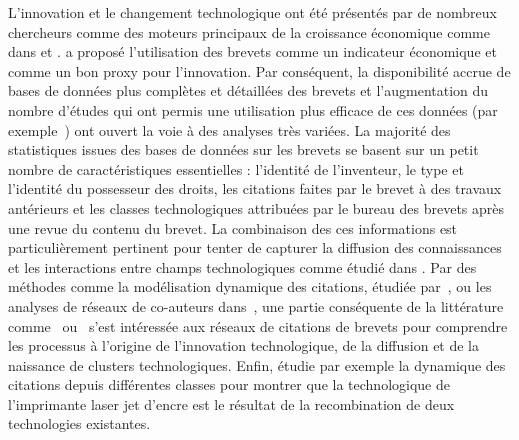 {L'innovation et le changement technologique ont été présentés par de nombreux chercheurs comme des moteurs principaux de la croissance économique comme dans \cite{aghionhowitt1992} et \cite{romer1990}. \cite{RePEc:nbr:nberwo:3301} a proposé l'utilisation des brevets comme un indicateur économique et comme un bon proxy pour l'innovation. Par conséquent, la disponibilité accrue de bases de données plus complètes et détaillées des brevets et l'augmentation du nombre d'études qui ont permis une utilisation plus efficace de ces données (par exemple~\cite{Hall2001}) ont ouvert la voie à des analyses très variées. La majorité des statistiques issues des bases de données sur les brevets se basent sur un petit nombre de caractéristiques essentielles : l'identité de l'inventeur, le type et l'identité du possesseur des droits, les citations faites par le brevet à des travaux antérieurs et les classes technologiques attribuées par le bureau des brevets après une revue du contenu du brevet. La combinaison des ces informations est particulièrement pertinent pour tenter de capturer la diffusion des connaissances et les interactions entre champs technologiques comme étudié dans \cite{Youn:2015fk}. Par des méthodes comme la modélisation dynamique des citations, étudiée par~\cite{newman2014prediction}, ou les analyses de réseaux de co-auteurs dans~\cite{sarigol2014predicting}, une partie conséquente de la littérature comme~\cite{sorenson2006complexity} ou~\cite{kay2014patent} s'est intéressée aux réseaux de citations de brevets pour comprendre les processus à l'origine de l'innovation technologique, de la diffusion et de la naissance de clusters technologiques. Enfin, \cite{bruck2016recognition} étudie par exemple la dynamique des citations depuis différentes classes pour montrer que la technologique de l'imprimante laser jet d'encre est le résultat de la recombination de deux technologies existantes.
}



